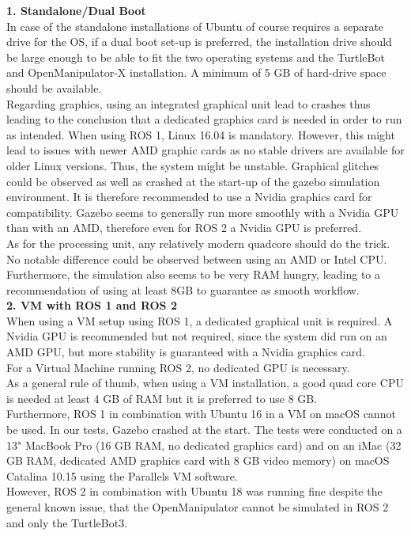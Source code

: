 \documentclass[plainarticle,zihtitle,english,final,hyperref,utf8]{zihpub}
\begin{document}
\textbf{1. Standalone/Dual Boot}\\
In case of the standalone installations of Ubuntu of course requires a separate drive for the OS, if a dual boot set-up is preferred, the installation drive should be large enough to be able to fit the two operating systems and the TurtleBot and OpenManipulator-X installation. A minimum of 5 GB of hard-drive space should be available. \\
\newline
Regarding graphics, using an integrated graphical unit lead to crashes thus leading to the conclusion that a dedicated graphics card is needed in order to run as intended. 
When using ROS 1, Linux 16.04 is mandatory. However, this might lead to issues with newer AMD graphic cards as no stable drivers are available for older Linux versions. Thus, the system might be unstable. Graphical glitches could be observed as well as crashed at the start-up of the gazebo simulation environment. It is therefore recommended to use a Nvidia graphics card for compatibility. Gazebo seems to generally run more smoothly with a Nvidia GPU than with an AMD, therefore even for ROS 2 a Nvidia GPU is preferred.\\
\newline
As for the processing unit, any relatively modern quadcore should do the trick. No notable difference could be observed between using an AMD or Intel CPU. \\
\newline
Furthermore, the simulation also seems to be very RAM hungry, leading to a recommendation of using at least 8GB to guarantee as smooth workflow.\\

\textbf{2. VM with ROS 1 and ROS 2}\\
When using a VM setup using ROS 1, a dedicated graphical unit is required. A Nvidia GPU is recommended but not required, since the system did run on an AMD GPU, but more stability is guaranteed with a Nvidia graphics card. \\
\newline
For a Virtual Machine running ROS 2, no dedicated GPU is necessary.\\
\newline
As a general rule of thumb, when using a VM installation, a good quad core CPU is needed at least 4 GB of RAM but it is preferred to use 8 GB.\\
\newline
Furthermore, ROS 1 in combination with Ubuntu 16 in a VM on macOS cannot be used. In our tests, Gazebo crashed at the start. The tests were conducted on a 13" MacBook Pro (16 GB RAM, no dedicated graphics card) and on an iMac (32 GB RAM, dedicated AMD graphics card with 8 GB video memory) on macOS Catalina 10.15 using the Parallels VM software. \\
However, ROS 2 in combination with Ubuntu 18 was running fine despite the general known issue, that the OpenManipulator cannot be simulated in ROS 2 and only the TurtleBot3.\\
\newline
\end{document}
